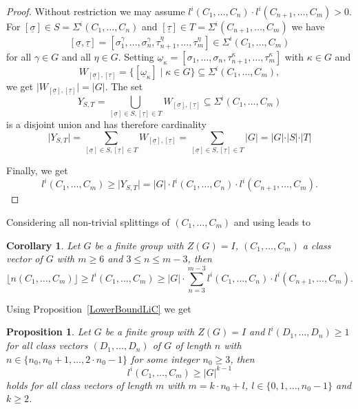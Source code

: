 \documentclass[12pt,a4paper]{article}
\newtheorem{proposition}{Proposition}[section]
\newtheorem{corollary}{Corollary}[section]
\numberwithin{equation}{section}
\numberwithin{table}{section}
\begin{document}
\begin{proof}
Without restriction we may assume $l^i(C_1,\dots, C_n) \cdot l^i(C_{n+1},\dots, C_m) > 0$.
For $[\underline{\sigma}] \in S = \Sigma^i(C_1,\dots, C_n)$ and $[\underline{\tau}] \in T = \Sigma^i(C_{n+1},\dots, C_m)$
we have 
$$[\underline{\sigma}, \underline{\tau}] = 
[\sigma_1^{\gamma}, \dots, \sigma_n^{\gamma}, \tau_{n+1}^{\eta}, \dots, \tau_m^{\eta}] \in \Sigma^i(C_1,\dots, C_m)$$
for all $\gamma \in G$ and all $\eta \in G$.
Setting $\underline{\omega}_{\kappa} = [\sigma_1, \dots, \sigma_n, \tau_{n+1}^{\kappa}, \dots, \tau_m^{\kappa}]$
with $\kappa \in G$ and
$$W_{[\underline{\sigma}], [\underline{\tau}]} = \{ [\underline{\omega}_{\kappa}] \mid \kappa \in G \} \subseteq \Sigma^i(C_1,\dots, C_m),$$
we get $\vert W_{[\underline{\sigma}], [\underline{\tau}]} \vert = \vert G \vert$. The set
$$Y_{S,T} = \bigcup_{[\underline{\sigma}] \in S,[\underline{\tau}] \in T} W_{[\underline{\sigma}], [\underline{\tau}]} 
\subseteq \Sigma^i(C_1,\dots, C_m)$$ is a disjoint union and has therefore cardinality
$$\vert Y_{S,T} \vert = \sum_{[\underline{\sigma}] \in S,[\underline{\tau}] \in T} W_{[\underline{\sigma}], [\underline{\tau}]} =
\sum_{[\underline{\sigma}] \in S,[\underline{\tau}] \in T} \vert G \vert = 
\vert G \vert \cdot \vert S \vert \cdot \vert T \vert $$
\par
\noindent
Finally, we get
$$l^i(C_1,\dots, C_m) \geq \vert Y_{S,T} \vert = \vert G \vert \cdot l^i(C_1,\dots, C_n) \cdot l^i(C_{n+1},\dots, C_m).$$
\end{proof}
%
\noindent
Considering all non-trivial splittings of $(C_1,\dots, C_m)$ and using \cite[I, Corollary 5.6]{RefMM2018} leads to
%
\begin{corollary}
\label{SumOfLowerBoundLiC} 
Let $G$ be a finite group with $Z(G) = I$, $(C_1,\dots, C_m)$ a class vector of $G$
with $m \geq 6$ and $3 \leq n \leq m-3$, then
$$\lfloor n(C_1,\dots, C_m) \rfloor \geq
l^i(C_1,\dots, C_m) \geq \vert G \vert \cdot \sum_{n=3}^{m-3} l^i(C_1,\dots, C_n) \cdot l^i(C_{n+1},\dots, C_m).$$
\end{corollary}
%
\noindent
Using Proposition~\ref{LowerBoundLiC} we get
%
\begin{proposition}
\label{LiCNotZero} 
Let $G$ be a finite group with $Z(G) = I$ and
$l^i(D_1,\dots, D_n) \geq 1$ for all class vectors $(D_1,\dots, D_n)$ of $G$ of length $n$ 
with $n \in \{ n_0, n_0+1,\dots, 2 \cdot n_0-1 \}$ for some integer $n_0 \geq 3$, then 
$$l^i(C_1,\dots, C_m) \geq {\vert G \vert}^{k-1}$$
holds for all class vectors of length $m$ with $m=k \cdot n_0 + l$, $l \in \{0,1,\dots, n_0-1 \}$ and $k \geq 2$.
\end{proposition}
\end{document}
